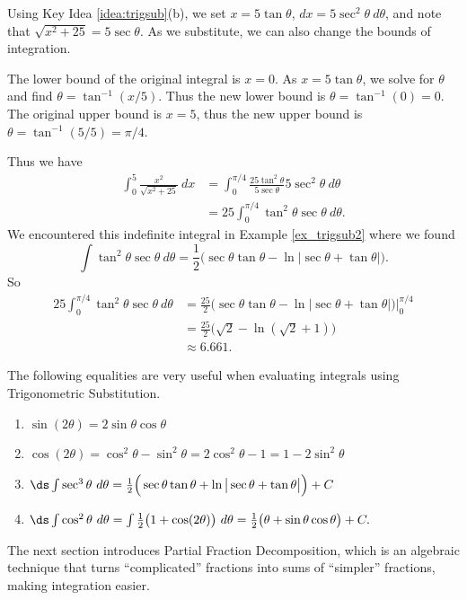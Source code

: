 {Using Key Idea \ref{idea:trigsub}(b), we set $x=5\tan\theta$, $dx = 5\sec^2\theta\ d\theta$, and note that $\sqrt{x^2+25} = 5\sec\theta$. As we substitute, we can also change the bounds of integration.

The lower bound of the original integral is $x=0$. As $x=5\tan\theta$, we solve for $\theta$ and find $\theta = \tan^{-1}(x/5)$. Thus the new lower bound is $\theta = \tan^{-1}(0) = 0$. The original upper bound is $x=5$, thus the new upper bound is $\theta = \tan^{-1}(5/5) = \pi/4$. 

Thus we have 
\begin{align*}
\int_0^5\frac{x^2}{\sqrt{x^2+25}}\ dx &= \int_0^{\pi/4} \frac{25\tan^2\theta}{5\sec\theta}5\sec^2\theta\ d\theta\\
		&= 25\int_0^{\pi/4} \tan^2\theta\sec\theta\ d\theta.
\end{align*}
We encountered this indefinite integral in Example \ref{ex_trigsub2} where we found 
$$\int \tan^2\theta\sec\theta \ d\theta = \frac12\big(\sec\theta\tan\theta-\ln|\sec\theta+\tan\theta|\big).$$
So
\begin{align*}
25\int_0^{\pi/4} \tan^2\theta\sec\theta\ d\theta &= \frac{25}2\big(\sec\theta\tan\theta-\ln|\sec\theta+\tan\theta|\big)\Bigg|_0^{\pi/4}\\
&= \frac{25}2\big(\sqrt2-\ln(\sqrt2+1)\big)\\
&\approx 6.661.
\end{align*}}

The following equalities are very useful when evaluating integrals using Trigonometric Substitution. 

{\begin{enumerate}
	\item	$\sin(2\theta) = 2\sin\theta\cos\theta$
	\item	$\cos(2\theta) = \cos^2\theta - \sin^2\theta = 2\cos^2\theta-1 = 1-2\sin^2\theta$
	\item $\ds \int \sec^3\theta\ d\theta = \frac12\Big(\sec \theta\tan \theta + \ln\big|\sec \theta+\tan \theta\big|\Big)+C$
	\item	$\ds \int \cos^2\theta\ d\theta = \int \frac12\big(1+\cos(2\theta)\big)\ d\theta = \frac12\big(\theta+\sin\theta\cos\theta\big)+C.$
\end{enumerate}
}

The next section introduces Partial Fraction Decomposition, which is an algebraic technique that turns ``complicated'' fractions into sums of ``simpler'' fractions, making integration easier.




